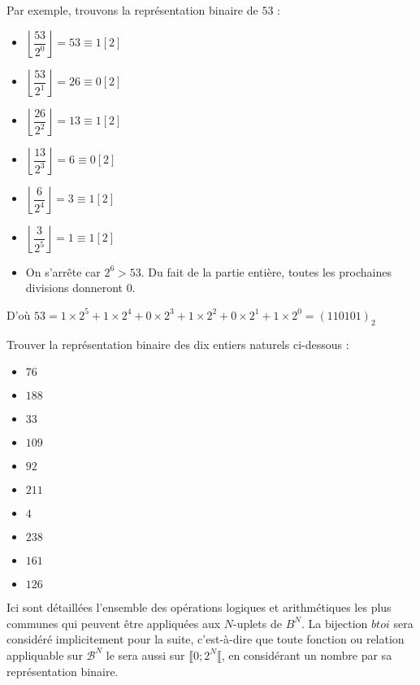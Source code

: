 \documentclass[../../main.tex]{subfiles}
\begin{document}
Par exemple, trouvons la représentation binaire de $53$ :
\begin{itemize}
     \item $\left\lfloor{\dfrac{53}{2^{0}}}\right\rfloor = 53 \equiv{1}[2]$
     \item $\left\lfloor{\dfrac{53}{2^{1}}}\right\rfloor = 26 \equiv{0}[2]$
     \item $\left\lfloor{\dfrac{26}{2^{2}}}\right\rfloor = 13 \equiv{1}[2]$
     \item $\left\lfloor{\dfrac{13}{2^{3}}}\right\rfloor = 6 \equiv{0}[2]$
     \item $\left\lfloor{\dfrac{6}{2^{4}}}\right\rfloor = 3 \equiv{1}[2]$
     \item $\left\lfloor{\dfrac{3}{2^{5}}}\right\rfloor = 1 \equiv{1}[2]$
     \item On s'arrête car $2^{6} > 53$. Du fait de la partie entière, toutes les prochaines divisions donneront 0.
\end{itemize}
D'où $53 = 1\times{2^{5}} + 1\times{2^{4}} + 0\times{2^{3}} + 1\times{2^{2}} + 0\times{2^{1}} + 1\times 2^{0} = (110101)_{2}$

\newline
Trouver la représentation binaire des dix entiers naturels ci-dessous :

\begin{minipage}{0.5\textwidth}
\begin{itemize}
     \item $76$
     \item $188$
     \item $33$
     \item $109$
     \item $92$
\end{itemize}
\end{minipage}
\begin{minipage}{0.5\textwidth}
\begin{itemize}
     \item $211$
     \item $4$
     \item $238$
     \item $161$
     \item $126$
\end{itemize}
\end{minipage}

Ici sont détaillées l'ensemble des opérations logiques et arithmétiques les plus communes qui peuvent être appliquées aux $N$-uplets de $B^{N}$. La bijection $btoi$ sera considéré implicitement pour la suite, c'est-à-dire que toute fonction ou relation appliquable sur $\mathcal{B}^{N}$ le sera aussi sur $\llbracket 0; 2^{N}\llbracket $, en considérant un nombre par sa représentation binaire.
\end{document}

